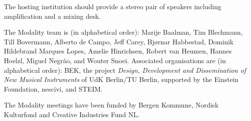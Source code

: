 \documentclass{article}
\begin{document}
The hosting institution should provide a stereo pair of speakers including amplification and a mixing desk.

\begin{acknowledgments}
The Modality team is (in alphabetical order):
    Marije Baalman,
    Tim Blechmann,
    Till Bovermann,
    Alberto de Campo,
    Jeff Carey,
    Bj\o{}rnar Habbestad,
    Dominik Hildebrand Marques Lopes,
    Amelie Hinrichsen,
    Robert van Heumen,
    Hannes Hoelzl,
    Miguel Negr\~{a}o, and
    Wouter Snoei.
Associated organisations are (in alphabetical order):
BEK,
the project \emph{Design, Development and Dissemination of New Musical Instruments} of UdK Berlin/TU Berlin, supported by the Einstein Foundation,
nescivi, and
STEIM.

The Modality meetings have been funded by Bergen Kommune, Nordisk Kulturfond and Creative Industries Fund NL.
\end{acknowledgments} 


\end{document}
